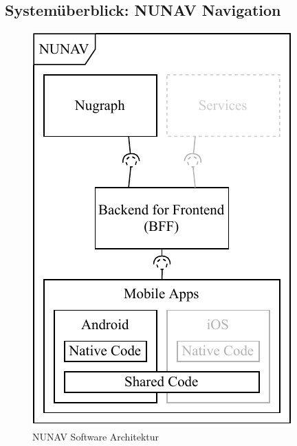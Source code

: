 \subsection{Systemüberblick: NUNAV Navigation}

\begin{figure}
    \centering
    \includegraphics{contents/06_model_evaluation/01_integration/res/nunav_architecture.pdf}
    \caption{NUNAV Software Architektur}
\end{figure}